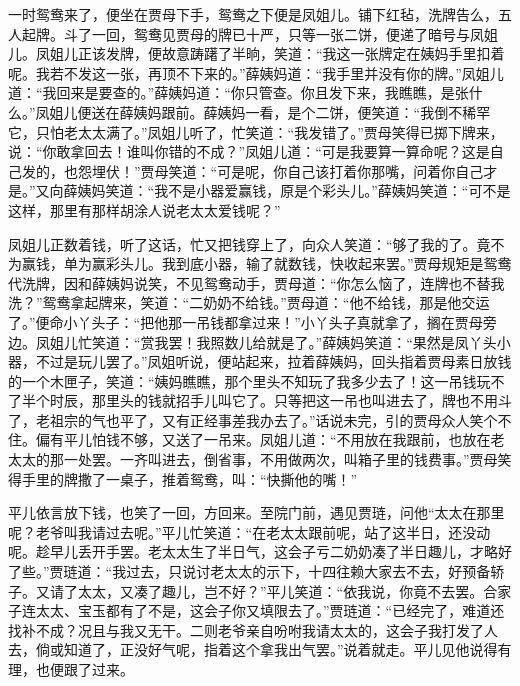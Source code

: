 \documentclass[12pt,oneside]{book}
\begin{document}
一时鸳鸯来了，便坐在贾母下手，鸳鸯之下便是凤姐儿。铺下红毡，洗牌告么，五人起牌。斗了一回，鸳鸯见贾母的牌已十严，只等一张二饼，便递了暗号与凤姐儿。凤姐儿正该发牌，便故意踌躇了半晌，笑道：“我这一张牌定在姨妈手里扣着呢。我若不发这一张，再顶不下来的。”薛姨妈道：“我手里并没有你的牌。”凤姐儿道：“我回来是要查的。”薛姨妈道：“你只管查。你且发下来，我瞧瞧，是张什么。”凤姐儿便送在薛姨妈跟前。薛姨妈一看，是个二饼，便笑道：“我倒不稀罕它，只怕老太太满了。”凤姐儿听了，忙笑道：“我发错了。”贾母笑得已掷下牌来，说：“你敢拿回去！谁叫你错的不成？”凤姐儿道：“可是我要算一算命呢？这是自己发的，也怨埋伏！”贾母笑道：“可是呢，你自己该打着你那嘴，问着你自己才是。”又向薛姨妈笑道：“我不是小器爱赢钱，原是个彩头儿。”薛姨妈笑道：“可不是这样，那里有那样胡涂人说老太太爱钱呢？”

凤姐儿正数着钱，听了这话，忙又把钱穿上了，向众人笑道：“够了我的了。竟不为赢钱，单为赢彩头儿。我到底小器，输了就数钱，快收起来罢。”贾母规矩是鸳鸯代洗牌，因和薛姨妈说笑，不见鸳鸯动手，贾母道：“你怎么恼了，连牌也不替我洗？”鸳鸯拿起牌来，笑道：“二奶奶不给钱。”贾母道：“他不给钱，那是他交运了。”便命小丫头子：“把他那一吊钱都拿过来！”小丫头子真就拿了，搁在贾母旁边。凤姐儿忙笑道：“赏我罢！我照数儿给就是了。”薛姨妈笑道：“果然是凤丫头小器，不过是玩儿罢了。”凤姐听说，便站起来，拉着薛姨妈，回头指着贾母素日放钱的一个木匣子，笑道：“姨妈瞧瞧，那个里头不知玩了我多少去了！这一吊钱玩不了半个时辰，那里头的钱就招手儿叫它了。只等把这一吊也叫进去了，牌也不用斗了，老祖宗的气也平了，又有正经事差我办去了。”话说未完，引的贾母众人笑个不住。偏有平儿怕钱不够，又送了一吊来。凤姐儿道：“不用放在我跟前，也放在老太太的那一处罢。一齐叫进去，倒省事，不用做两次，叫箱子里的钱费事。”贾母笑得手里的牌撒了一桌子，推着鸳鸯，叫：“快撕他的嘴！”

平儿依言放下钱，也笑了一回，方回来。至院门前，遇见贾琏，问他“太太在那里呢？老爷叫我请过去呢。”平儿忙笑道：“在老太太跟前呢，站了这半日，还没动呢。趁早儿丢开手罢。老太太生了半日气，这会子亏二奶奶凑了半日趣儿，才略好了些。”贾琏道：“我过去，只说讨老太太的示下，十四往赖大家去不去，好预备轿子。又请了太太，又凑了趣儿，岂不好？”平儿笑道：“依我说，你竟不去罢。合家子连太太、宝玉都有了不是，这会子你又填限去了。”贾琏道：“已经完了，难道还找补不成？况且与我又无干。二则老爷亲自吩咐我请太太的，这会子我打发了人去，倘或知道了，正没好气呢，指着这个拿我出气罢。”说着就走。平儿见他说得有理，也便跟了过来。
\end{document}
